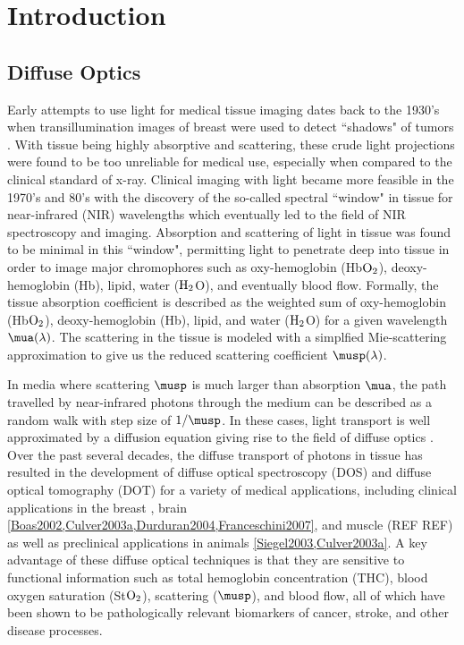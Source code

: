 \chapter{Introduction}

\section{Diffuse Optics}
Early attempts to use light for medical tissue imaging dates back to the 1930's when transillumination images of breast were used to detect ``shadows" of tumors \cite{Cutler1931}. With tissue being highly absorptive and scattering, these crude light projections were found to be too unreliable for medical use, especially when compared to the clinical standard of x-ray. Clinical imaging with light became more feasible in the 1970's and 80's with the discovery of the so-called spectral ``window" in tissue \cite{Jobsis1977,Jo1999,Jo1999a} for near-infrared (NIR) wavelengths which eventually led to the field of NIR spectroscopy and imaging. Absorption and scattering of light in tissue was found to be minimal in this ``window", permitting light to penetrate deep into tissue in order to image major chromophores such as oxy-hemoglobin (Hb$\rm{O_2}$), deoxy-hemoglobin (Hb), lipid, water ($\rm{H_2}$O), and eventually blood flow. Formally, the tissue absorption coefficient is described as the weighted sum of oxy-hemoglobin (Hb$\rm{O_2}$), deoxy-hemoglobin (Hb), lipid, and water ($\rm{H_2}$O) for a given wavelength $\mua(\lambda)$. The scattering in the tissue is modeled with a simplfied Mie-scattering approximation to give us the reduced scattering coefficient $\musp(\lambda)$.

In media where scattering $\musp$ is much larger than absorption $\mua$, the path travelled by near-infrared photons through the medium can be described as a random walk with step size of $1/\musp$. In these cases, light transport is well approximated by a diffusion equation giving rise to the field of diffuse optics \cite{Ishimaru1978,rossum_99_1,Case1967}. Over the past several decades, the diffuse transport of photons in tissue has resulted in the development of diffuse optical spectroscopy (DOS) and diffuse optical tomography (DOT) for a variety of medical applications, including clinical applications in the breast \cite{Colak1999,Ntziachristos2000,Hawrysz2000,McBride2001,Ntziachristos2002,Durduran2002,Intes2003,Culver2003,Corlu2003,Li2003,Durduran2005,Choe2005a,Yates2005,Corlu2007,Cerussi2007,Choe2009,Durduran2010}, brain \ref{Boas2002,Culver2003a,Durduran2004,Franceschini2007}, and muscle (REF REF) as well as preclinical applications in animals \ref{Siegel2003,Culver2003a}. A key advantage of these diffuse optical techniques is that they are sensitive to functional information such as total hemoglobin concentration (THC), blood oxygen saturation (St$\rm{O_2}$), scattering ($\musp$), and blood flow, all of which have been shown to be pathologically relevant biomarkers of cancer, stroke, and other disease processes.

